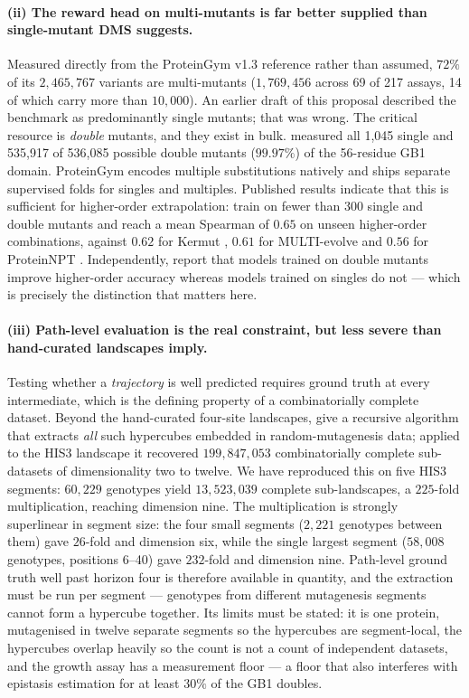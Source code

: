 \documentclass[12pt, a4paper]{article}
\begin{document}
\paragraph{(ii) The reward head on multi-mutants is far better supplied than single-mutant DMS suggests.} Measured directly from the ProteinGym v1.3 reference rather than assumed, $72\%$ of its $2{,}465{,}767$ variants are multi-mutants ($1{,}769{,}456$ across 69 of 217 assays, 14 of which carry more than $10{,}000$). An earlier draft of this proposal described the benchmark as predominantly single mutants; that was wrong. The critical resource is \textit{double} mutants, and they exist in bulk. \citet{olson2014gb1} measured all 1{,}045 single and 535{,}917 of 536{,}085 possible double mutants ($99.97\%$) of the 56-residue GB1 domain. ProteinGym encodes multiple substitutions natively and ships separate supervised folds for singles and multiples. Published results indicate that this is sufficient for higher-order extrapolation: \citet{wang2026atlas} train on fewer than 300 single and double mutants and reach a mean Spearman of $0.65$ on unseen higher-order combinations, against $0.62$ for Kermut \citep{groth2024kermut}, $0.61$ for MULTI-evolve \citep{tran2026multievolve} and $0.56$ for ProteinNPT \citep{notin2023proteinnpt}. Independently, \citet{barnes2026foldx} report that models trained on double mutants improve higher-order accuracy whereas models trained on singles do not --- which is precisely the distinction that matters here.

\paragraph{(iii) Path-level evaluation is the real constraint, but less severe than hand-curated landscapes imply.} Testing whether a \textit{trajectory} is well predicted requires ground truth at every intermediate, which is the defining property of a combinatorially complete dataset. Beyond the hand-curated four-site landscapes, \citet{esteban2019hypercubeme} give a recursive algorithm that extracts \textit{all} such hypercubes embedded in random-mutagenesis data; applied to the HIS3 landscape \citep{pokusaeva2019his3} it recovered $199{,}847{,}053$ combinatorially complete sub-datasets of dimensionality two to twelve. We have reproduced this on five HIS3 segments: $60{,}229$ genotypes yield $13{,}523{,}039$ complete sub-landscapes, a $225$-fold multiplication, reaching dimension nine. The multiplication is strongly superlinear in segment size: the four small segments ($2{,}221$ genotypes between them) gave $26$-fold and dimension six, while the single largest segment ($58{,}008$ genotypes, positions 6--40) gave $232$-fold and dimension nine. Path-level ground truth well past horizon four is therefore available in quantity, and the extraction must be run per segment --- genotypes from different mutagenesis segments cannot form a hypercube together. Its limits must be stated: it is one protein, mutagenised in twelve separate segments so the hypercubes are segment-local, the hypercubes overlap heavily so the count is not a count of independent datasets, and the growth assay has a measurement floor --- a floor that also interferes with epistasis estimation for at least $30\%$ of the GB1 doubles.
\end{document}
